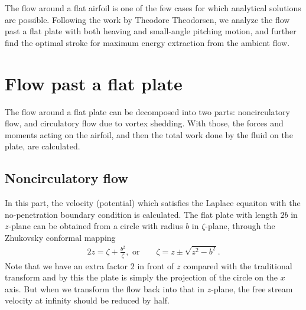 
The flow around a flat airfoil is one of the few cases for which analytical solutions are possible.
Following the work by Theodore Theodorsen, we analyze the flow past a flat plate with both heaving and small-angle pitching motion, and further find the optimal stroke for maximum energy extraction from the ambient flow. 

\section{Flow past a flat plate}

The flow around a flat plate can be decomposed into two parts: noncirculatory flow, and circulatory flow due to vortex shedding.
With those, the forces and moments acting on the airfoil, and then the total work done by the fluid on the plate, are calculated.

\subsection{Noncirculatory flow}

In this part, the velocity (potential) which satisfies the Laplace equaiton with the no-penetration boundary condition is calculated.
The flat plate with length $2b$ in $z$-plane can be obtained from a circle with radius $b$ in $\zeta$-plane, through the Zhukovsky conformal mapping
\begin{align}
2z = \zeta + \frac{b^2}{\zeta},    \text{   or~~~~~~}   \zeta =z \pm \sqrt{z^2-b^2}.
\end{align}
Note that we have an extra factor $2$ in front of $z$ compared with the traditional transform and by this the plate is simply the projection of the circle on the  $x$ axis.
But when we transform the flow back into that in $z$-plane, the free stream velocity at infinity should be reduced by half.

